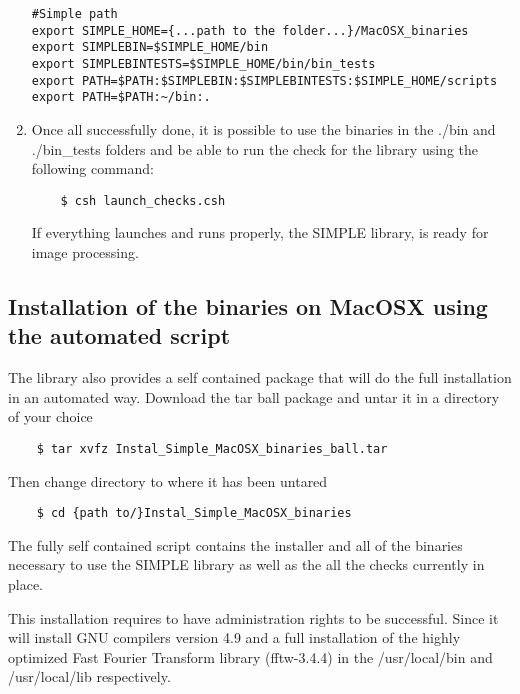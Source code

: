 \documentclass[review]{elsarticle}
\begin{document}
\begin{enumerate}
\begin{verbatim}
#Simple path
export SIMPLE_HOME={...path to the folder...}/MacOSX_binaries
export SIMPLEBIN=$SIMPLE_HOME/bin
export SIMPLEBINTESTS=$SIMPLE_HOME/bin/bin_tests
export PATH=$PATH:$SIMPLEBIN:$SIMPLEBINTESTS:$SIMPLE_HOME/scripts
export PATH=$PATH:~/bin:.
\end{verbatim}

\item {\label{run_checks}} Once all successfully done, it is possible
  to use the binaries in the ./bin and ./bin\_tests folders and be able to run
  the check for the library using the following command:
\begin{verbatim}
    $ csh launch_checks.csh
\end{verbatim}
If everything launches and runs properly, the SIMPLE library, is ready
for image processing.
\end{enumerate}


\subsection{Installation of the binaries on MacOSX using the automated
  script}
\label{inst_auto_binaries_macosx}

The library also provides a self contained package that will do the
full installation in an automated way. Download the tar ball package
and untar it in a directory of your choice 
\begin{verbatim}
    $ tar xvfz Instal_Simple_MacOSX_binaries_ball.tar
\end{verbatim}
Then change directory to where it has been untared
\begin{verbatim}
    $ cd {path to/}Instal_Simple_MacOSX_binaries
\end{verbatim}
The fully self contained script contains the installer and all of the
binaries necessary to use the SIMPLE library as well as the all the
checks currently in place.

This installation requires to have administration rights to be
successful. Since it will install GNU compilers version 4.9 and a full
installation of the highly optimized Fast Fourier Transform library
(fftw-3.4.4) in the /usr/local/bin and /usr/local/lib respectively.
\end{document}
